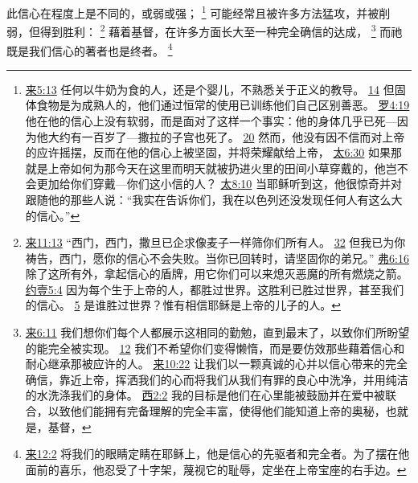 \documentclass[12pt, a4paper, oneside]{ctexart}
\newcounter{parnum}[section]
\newcommand{\N}{%
   \noindent\refstepcounter{parnum}%
    \makebox[\parindent][l]{\textbf{\arabic{parnum}.}}}
\begin{document}
\N 此信心在程度上是不同的，或弱或强；
	\footnote {
		\href{https://biblehub.com/hebrews/5-13.htm}{来5:13} 任何以牛奶为食的人，还是个婴儿，不熟悉关于正义的教导。
		\href{https://biblehub.com/hebrews/5-14.htm}{14} 但固体食物是为成熟人的，他们通过恒常的使用已训练他们自己区别善恶。
		\href{https://biblehub.com/romans/4-19.htm}{罗4:19} 他在他的信心上没有软弱，而是面对了这样一个事实：他的身体几乎已死---因为他大约有一百岁了---撒拉的子宫也死了。
		\href{https://biblehub.com/romans/4-20.htm}{20} 然而，他没有因不信而对上帝的应许摇摆，反而在他的信心上被坚固，并将荣耀献给上帝，
		\href{https://biblehub.com/matthew/6-30.htm}{太6:30} 如果那就是上帝如何为那今天在这里而明天就被扔进火里的田间小草穿戴的，他岂不会更加给你们穿戴---你们这小信的人？
		\href{https://biblehub.com/matthew/8-10.htm}{太8:10} 当耶稣听到这，他很惊奇并对跟随他的那些人说：“我实在告诉你们，我在以色列还没发现任何人有这么大的信心。”
	}
	可能经常且被许多方法猛攻，并被削弱，但得到胜利：
	\footnote {
		\href{https://biblehub.com/luke/22-31.htm}{来11:13} “西门，西门，撒旦已企求像麦子一样筛你们所有人。
		\href{https://biblehub.com/luke/22-32.htm}{32} 但我已为你祷告，西门，愿你的信心不会失败。当你已回转时，请坚固你的弟兄。”
		\href{https://biblehub.com/ephesians/6-16.htm}{弗6:16} 除了这所有外，拿起信心的盾牌，用它你们可以来熄灭恶魔的所有燃烧之箭。
		\href{https://biblehub.com/1_john/5-4.htm}{约壹5:4} 因为每个生于上帝的人，都胜过世界。这胜利已胜过世界，甚至我们的信心。
		\href{https://biblehub.com/1_john/5-5.htm}{5} 是谁胜过世界？惟有相信耶稣是上帝的儿子的人。
	}
	藉着基督，在许多方面长大至一种完全确信的达成，
	\footnote {
		\href{https://biblehub.com/hebrews/6-11.htm}{来6:11} 我们想你们每个人都展示这相同的勤勉，直到最末了，以致你们所盼望的能完全被实现。
		\href{https://biblehub.com/hebrews/6-12.htm}{12} 我们不希望你们变得懒惰，而是要仿效那些藉着信心和耐心继承那被应许的人。
		\href{https://biblehub.com/hebrews/10-22.htm}{来10:22} 让我们以一颗真诚的心并以信心带来的完全确信，靠近上帝，挥洒我们的心而将我们从我们有罪的良心中洗净，并用纯洁的水洗涤我们的身体。
		\href{https://biblehub.com/colossians/2-2.htm}{西2:2} 我的目标是他们在心里能被鼓励并在爱中被联合，以致他们能拥有完备理解的完全丰富，使得他们能知道上帝的奥秘，也就是，基督，
	}
	而祂既是我们信心的著者也是终者。
	\footnote {
		\href{https://biblehub.com/hebrews/12-2.htm}{来12:2} 将我们的眼睛定睛在耶稣上，他是信心的先驱者和完全者。为了摆在他面前的喜乐，他忍受了十字架，蔑视它的耻辱，定坐在上帝宝座的右手边。
	}
\end{document}
